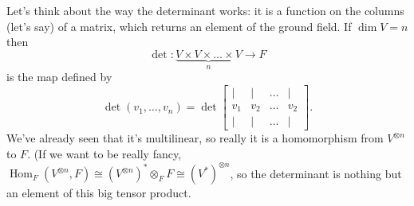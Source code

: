 \documentclass[12pt]{article}
\newcommand{\Hom}{\operatorname{Hom}}
\begin{document}
Let's think about the way the determinant works: it is a function on
the columns (let's say) of a matrix, which returns an element of the
ground field. If $\dim V=n$ then \[\det:
  \underbrace{V\times V\times\dotsc \times V}_n
  \rightarrow F\] is the map defined by \[\det(v_1,\dotsc, v_n) =
  \det \begin{bmatrix} | & | & \dotsc & | \\ v_1 & v_2 & \dotsc &
    v_2\\| & | & \dotsc & |\end{bmatrix}.\] We've already seen that
it's multilinear, so really it is a homomorphism from $V^{\otimes n}$
to $F$. (If we want to be really fancy, $\Hom_F(V^{\otimes n}, F)
\cong (V^{\otimes n})^* \otimes_F F \cong (V^*)^{\otimes n}$, so the
determinant is nothing but an element of this big tensor product. 
\end{document}
